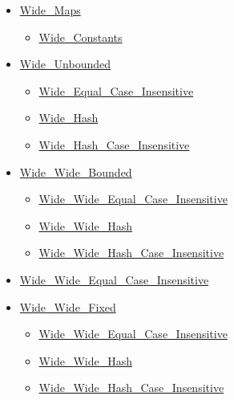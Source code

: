 \documentclass[english]{article}
\begin{document}
\begin{scriptsize}
\begin{multicols*}{5}
\begin{itemize}[leftmargin=0mm]
\begin{itemize}[leftmargin=5mm]
\begin{itemize}[leftmargin=5mm]
	\item[] \href{http://www.ada-auth.org/standards/22rm/html/RM-A-4-7.html}{Wide\_Maps}
	  \begin{itemize}[leftmargin=5mm]
	  \item[] \href{http://www.ada-auth.org/standards/22rm/html/RM-A-4-7.html}{Wide\_Constants}
	  \end{itemize}
	\item[] \href{http://www.ada-auth.org/standards/22rm/html/RM-A-4-7.html}{Wide\_Unbounded}
	  \begin{itemize}[leftmargin=5mm]
	  \item[] \href{http://www.ada-auth.org/standards/22rm/html/RM-A-4-7.html}{Wide\_Equal\_Case\_Insensitive}
	  \item[] \href{http://www.ada-auth.org/standards/22rm/html/RM-A-4-7.html}{Wide\_Hash}
	  \item[] \href{http://www.ada-auth.org/standards/22rm/html/RM-A-4-7.html}{Wide\_Hash\_Case\_Insensitive}
	  \end{itemize}
	\item[] \href{http://www.ada-auth.org/standards/22rm/html/RM-A-4-8.html}{Wide\_Wide\_Bounded}
	  \begin{itemize}[leftmargin=5mm]
	  \item[] \href{http://www.ada-auth.org/standards/22rm/html/RM-A-4-8.html}{Wide\_Wide\_Equal\_Case\_Insensitive}
	  \item[] \href{http://www.ada-auth.org/standards/22rm/html/RM-A-4-8.html}{Wide\_Wide\_Hash}
	  \item[] \href{http://www.ada-auth.org/standards/22rm/html/RM-A-4-8.html}{Wide\_Wide\_Hash\_Case\_Insensitive}
	  \end{itemize}
	\item[] \href{http://www.ada-auth.org/standards/22rm/html/RM-A-4-8.html}{Wide\_Wide\_Equal\_Case\_Insensitive}
	\item[] \href{http://www.ada-auth.org/standards/22rm/html/RM-A-4-8.html}{Wide\_Wide\_Fixed}
	  \begin{itemize}[leftmargin=5mm]
	  \item[] \href{http://www.ada-auth.org/standards/22rm/html/RM-A-4-8.html}{Wide\_Wide\_Equal\_Case\_Insensitive}
	  \item[] \href{http://www.ada-auth.org/standards/22rm/html/RM-A-4-8.html}{Wide\_Wide\_Hash}
	  \item[] \href{http://www.ada-auth.org/standards/22rm/html/RM-A-4-8.html}{Wide\_Wide\_Hash\_Case\_Insensitive}
	  \end{itemize}

\end{itemize}
\end{itemize}
\end{itemize}
\end{multicols*}
\end{scriptsize}
\end{document}
